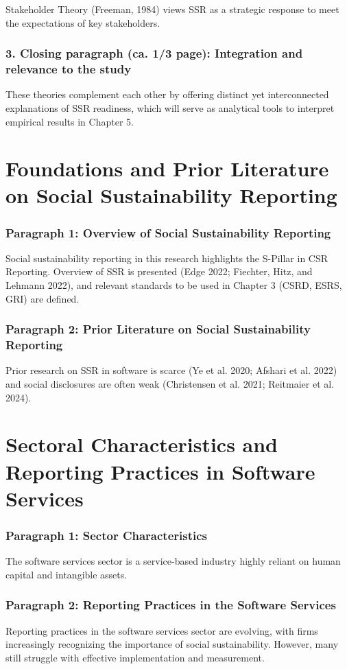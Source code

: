 Stakeholder Theory (Freeman, 1984) views SSR as a strategic response to meet the expectations of key stakeholders.

\subsubsection{3. Closing paragraph (ca. 1/3 page): Integration and relevance to the study}

These theories complement each other by offering distinct yet interconnected explanations of SSR readiness, 
which will serve as analytical tools to interpret empirical results in Chapter 5.

\section{Foundations and Prior Literature on Social Sustainability Reporting}
\subsubsection{Paragraph 1: Overview of Social Sustainability Reporting}
Social sustainability reporting in this research highlights the S-Pillar in CSR Reporting.
Overview of SSR is presented (Edge 2022; Fiechter, Hitz, and
Lehmann 2022), and relevant standards to be used in Chapter 3 (CSRD, ESRS, GRI) are defined.

\subsubsection{Paragraph 2: Prior Literature on Social Sustainability Reporting}
Prior research on SSR in software is scarce (Ye et al. 2020; Afshari et al. 2022) and 
social disclosures are often weak (Christensen et al. 2021; Reitmaier et al. 2024).


\section{Sectoral Characteristics and Reporting Practices in Software Services}
\subsubsection{Paragraph 1: Sector Characteristics}
The software services sector is a service-based industry highly reliant on human capital and intangible assets.

\subsubsection{Paragraph 2: Reporting Practices in the Software Services}
Reporting practices in the software services sector are evolving, with firms increasingly recognizing 
the importance of social sustainability. However, many still struggle with effective implementation and measurement.

